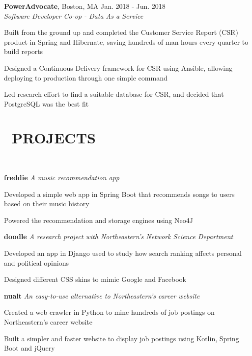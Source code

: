 \documentclass[11pt]{res}
\newcommand{\sectionunderline}{\vspace{-3mm}\hrulefill\\}
\newcommand{\newsect}[1]{\section{\Large \bf #1}}
\begin{document}
\begin{resume}
{{      {\bf PowerAdvocate}, Boston, MA \hfill Jan. 2018 - Jun. 2018\\
      {\it Software Developer Co-op - Data As a Service}
      \begin{itemize}
        {\item Built from the ground up and completed the Customer Service Report (CSR) product in Spring and Hibernate, saving hundreds of man hours every quarter to build reports}
        {\item Designed a Continuous Delivery framework for CSR using Ansible, allowing deploying to production through one simple command}
        {\item Led research effort to find a suitable database for CSR, and decided that PostgreSQL was the best fit}
      \end{itemize}
    }
  }

  \newsect{\faGithubAlt\ PROJECTS}{
    \sectionunderline{
      {\bf freddie} {\it A music recommendation app}
      \begin{itemize}
        {\item Developed a simple web app in Spring Boot that recommends songs to users based on their music history}
        {\item Powered the recommendation and storage engines using Neo4J}
      \end{itemize}

      {\bf doodle} {\it A research project with Northeastern's Network Science Department}
      \begin{itemize}
        {\item Developed an app in Django used to study how search ranking affects personal and political opinions}
        {\item Designed different CSS skins to mimic Google and Facebook}
      \end{itemize}

      {\bf nualt} {\it An easy-to-use alternative to Northeastern's career website}
      \begin{itemize}
        {\item Created a web crawler in Python to mine hundreds of job postings on Northeastern's career website}
        {\item Built a simpler and faster website to display job postings using Kotlin, Spring Boot and jQuery}
      \end{itemize}
    }
  }
\end{resume}
\end{document}
